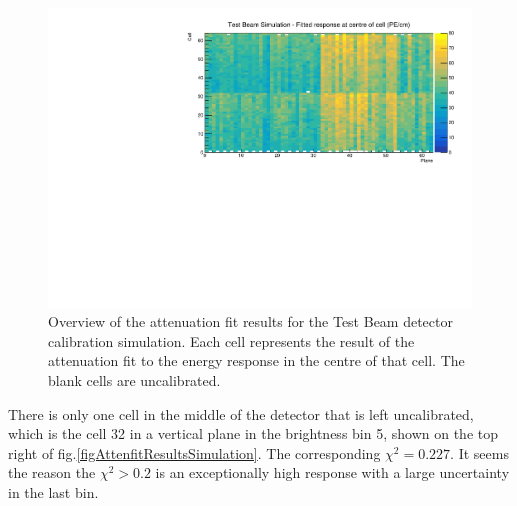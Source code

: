 \documentclass[12pt,a4paper]{article}
\begin{document}
\begin{figure}[h]
\centering
\includegraphics[width=\textwidth]{Plots/CellResponseAtCentre_Prod4DataBasedSim_Limited.pdf}
\caption{Overview of the attenuation fit results for the Test Beam detector calibration simulation. Each cell represents the result of the attenuation fit to the energy response in the centre of that cell. The blank cells are uncalibrated.}
\label{figCellCentreResponseSim}
\end{figure}

There is only one cell in the middle of the detector that is left uncalibrated, which is the cell 32 in a vertical plane in the brightness bin 5, shown on the top right of fig.\ref{figAttenfitResultsSimulation}. The corresponding $\chi^2=0.227$. It seems the reason the $\chi^2>0.2$ is an exceptionally high response with a large uncertainty in the last bin.
\end{document}
